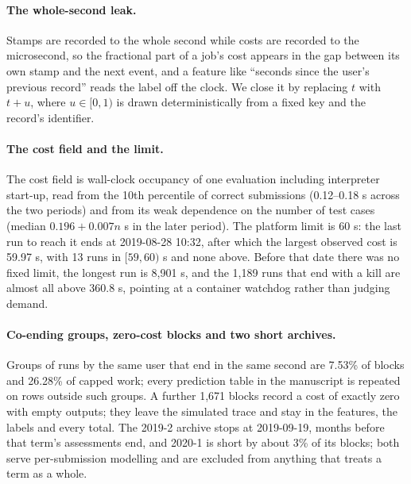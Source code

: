 \documentclass[mathematics,supfile,submit,moreauthors]{Definitions/mdpi}
\newcommand{\devnum}[1]{#1}
\begin{document}
\paragraph{The whole-second leak.}
Stamps are recorded to the whole second while costs are recorded to the microsecond, so
the fractional part of a job's cost appears in the gap between its own stamp and the next
event, and a feature like ``seconds since the user's previous record'' reads the label off
the clock. We close it by replacing $t$ with $t + u$, where $u \in [0,1)$ is drawn
deterministically from a fixed key and the record's identifier.

\paragraph{The cost field and the limit.}
The cost field is wall-clock occupancy of one evaluation including interpreter start-up,
read from the 10th percentile of correct submissions (\devnum{0.12}--\devnum{0.18} s
across the two periods) and from its weak dependence on the number of test cases (median
\devnum{$0.196 + 0.007 n$} s in the later period). The platform limit is \devnum{60} s:
the last run to reach it ends at \devnum{2019-08-28} \devnum{10{:}32}, after which the
largest observed cost is \devnum{59.97} s, with \devnum{13} runs in $[59,60)$ s and none
above. Before that date there was no fixed limit, the longest run is \devnum{8{,}901} s,
and the \devnum{1{,}189} runs that end with a kill are almost all above \devnum{360.8} s,
pointing at a container watchdog rather than judging demand.

\paragraph{Co-ending groups, zero-cost blocks and two short archives.}
Groups of runs by the same user that end in the same second are \devnum{7.53\%} of blocks
and \devnum{26.28\%} of capped work; every prediction table in the manuscript is repeated
on rows outside such groups. A further \devnum{1{,}671} blocks record a cost of exactly
zero with empty outputs; they leave the simulated trace and stay in the features, the
labels and every total. The \devnum{2019-2} archive stops at \devnum{2019-09-19}, months
before that term's assessments end, and \devnum{2020-1} is short by about \devnum{3\%} of
its blocks; both serve per-submission modelling and are excluded from anything that treats
a term as a whole.
\end{document}
